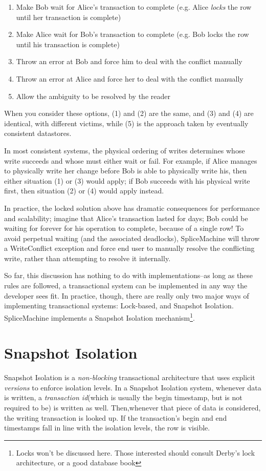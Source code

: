 \begin{enumerate}
				\item Make Bob wait for Alice's transaction to complete (e.g. Alice \emph{locks} the row until her transaction is complete)
				\item Make Alice wait for Bob's transaction to complete (e.g. Bob locks the row until his transaction is complete)
				\item Throw an error at Bob and force him to deal with the conflict manually
				\item Throw an error at Alice and force her to deal with the conflict manually
				\item Allow the ambiguity to be resolved by the reader
\end{enumerate}

When you consider these options, (1) and (2) are the same, and (3) and (4) are identical, with different victims, while (5) is the approach taken by eventually consistent datastores. 

In most consistent systems, the physical ordering of writes determines whose write succeeds and whose must either wait or fail. For example, if Alice manages to physically write her change before Bob is able to physically write his, then either situation (1) or (3) would apply; if Bob succeeds with his physical write first, then situation (2) or (4) would apply instead. 

In practice, the locked solution above has dramatic consequences for performance and scalability; imagine that Alice's transaction lasted for days; Bob could be waiting for forever for his operation to complete, because of a single row! To avoid perpetual waiting (and the associated deadlocks), SpliceMachine will throw a WriteConflict exception and force end user to manually resolve the conflicting write, rather than attempting to resolve it internally.

So far, this discussion has nothing to do with implementations--as long as these rules are followed, a transactional system can be implemented in any way the developer sees fit. In practice, though, there are really only two major ways of implementing transactional systems: Lock-based, and Snapshot Isolation. SpliceMachine implements a Snapshot Isolation mechanism\footnote{Locks won't be discussed here. Those interested should consult Derby's lock architecture, or a good database book}.

\section{Snapshot Isolation}
Snapshot Isolation is a \emph{non-blocking} transactional architecture that uses explicit \emph{versions} to enforce isolation levels. In a Snapshot Isolation system, whenever data is written, a \emph{transaction id}(which is usually the begin timestamp, but is not required to be) is written as well. Then,whenever that piece of data is considered, the writing transaction is looked up. If the transaction's begin and end timestamps fall in line with the isolation levels, the row is visible.

